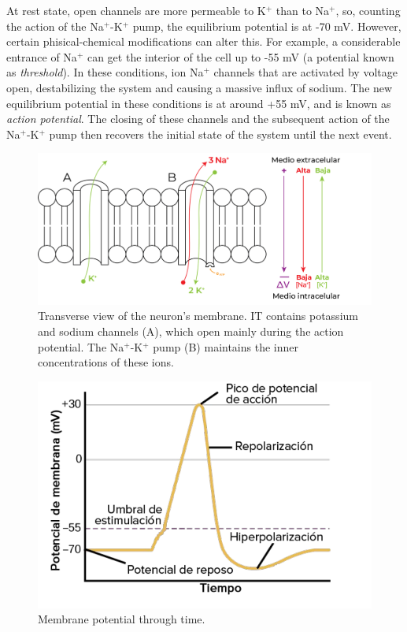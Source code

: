 At rest state, open channels are more permeable to K$^+$ than to Na$^+$, so, counting the action of the Na$^+$-K$^+$ pump, the equilibrium potential is at -70 mV. However, certain phisical-chemical modifications can alter this. For example, a considerable entrance of Na$^+$ can get the interior of the cell up to -55 mV (a potential known as \textit{threshold}). In these conditions, ion Na$^+$ channels that are activated by voltage open, destabilizing the system and causing a massive influx of sodium. The new equilibrium potential in these conditions is at around +55 mV, and is known as \textit{action potential}. The closing of these channels and the subsequent action of the Na$^+$-K$^+$ pump then recovers the initial state of the system until the next event.

\begin{figure}[H]
	\centering
	\includegraphics[width=\linewidth]{media/6-potencial.png}
	\caption{Transverse view of the neuron's membrane. IT contains potassium and sodium channels (A), which open mainly during the action potential. The Na$^+$-K$^+$ pump (B) maintains the inner concentrations of these ions.}
	\label{action}
\end{figure}

\begin{figure}[H]
	\centering
	\includegraphics[width=\linewidth]{media/6-potencialgraph.png}
	\caption{Membrane potential through time.}
	\label{actiongraph}
\end{figure}

